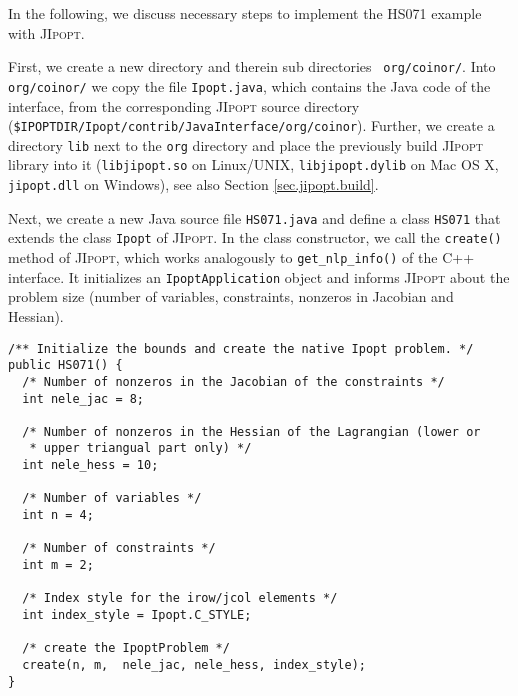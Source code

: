 \documentclass[10pt]{article}
\newcommand{\JIpopt}{\textsc{JIpopt}\xspace}
\begin{document}
In the following, we discuss necessary steps to implement the HS071 example 
with \JIpopt.

First, we create a new directory and therein sub directories {\tt 
org/coinor/}. Into {\tt org/coinor/} we copy the file {\tt Ipopt.java}, which 
contains the Java code of the interface, from the corresponding 
\JIpopt source directory
(\verb|$IPOPTDIR/Ipopt/contrib/JavaInterface/org/coinor|). %
Further, we create a directory {\tt lib} next to the {\tt org} directory and 
place the previously build \JIpopt library into it ({\tt libjipopt.so} on 
Linux/UNIX, {\tt libjipopt.dylib} on Mac OS X, {\tt jipopt.dll} on Windows), 
see also Section \ref{sec.jipopt.build}.

Next, we create a new Java source file {\tt HS071.java} and define a class 
{\tt HS071} that extends the class {\tt Ipopt} of \JIpopt.
In the class constructor, we call the {\tt create()} method of \JIpopt, which 
works analogously to {\tt get\_nlp\_info()} of the C++ interface.
It initializes an {\tt IpoptApplication} object and informs \JIpopt about the
problem size (number of variables, constraints, nonzeros in Jacobian and 
Hessian).

\begin{verbatim}
/** Initialize the bounds and create the native Ipopt problem. */
public HS071() {
  /* Number of nonzeros in the Jacobian of the constraints */
  int nele_jac = 8;
  
  /* Number of nonzeros in the Hessian of the Lagrangian (lower or
   * upper triangual part only) */
  int nele_hess = 10;

  /* Number of variables */
  int n = 4;
        
  /* Number of constraints */
  int m = 2;
        
  /* Index style for the irow/jcol elements */
  int index_style = Ipopt.C_STYLE;
        
  /* create the IpoptProblem */
  create(n, m,  nele_jac, nele_hess, index_style);
}
\end{verbatim}        
\end{document}
